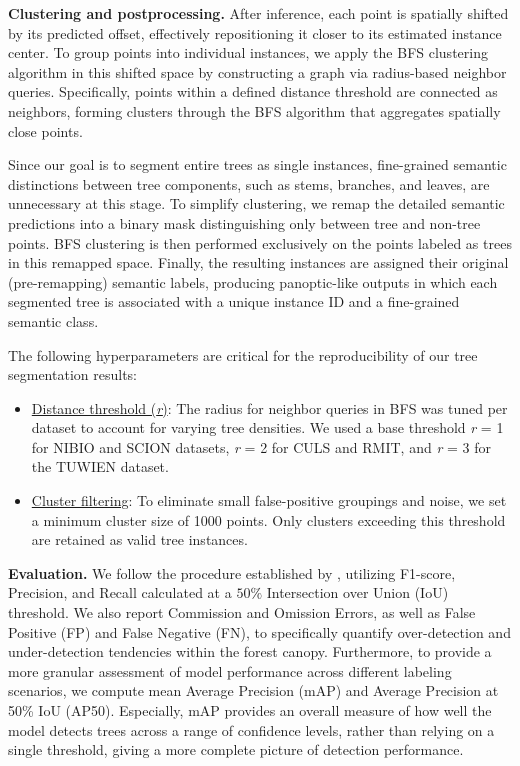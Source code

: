 \documentclass[review,authoryear]{elsarticle}
\begin{document}
\textbf{Clustering and postprocessing.} After inference, each point is spatially shifted by its predicted offset, effectively repositioning it closer to its estimated instance center. To group points into individual instances, we apply the BFS clustering algorithm in this shifted space by constructing a graph via radius-based neighbor queries. Specifically, points within a defined distance threshold are connected as neighbors, forming clusters through the BFS algorithm that aggregates spatially close points. 

Since our goal is to segment entire trees as single instances, fine-grained semantic distinctions between tree components, such as stems, branches, and leaves, are unnecessary at this stage. To simplify clustering, we remap the detailed semantic predictions into a binary mask distinguishing only between tree and non-tree points. BFS clustering is then performed exclusively on the points labeled as trees in this remapped space. Finally, the resulting instances are assigned their original (pre-remapping) semantic labels, producing panoptic-like outputs in which each segmented tree is associated with a unique instance ID and a fine-grained semantic class.

The following hyperparameters are critical for the reproducibility of our tree segmentation results:

\begin{itemize}
    \item \underline{Distance threshold (\textit{r})}: The radius for neighbor queries in BFS was tuned per dataset to account for varying tree densities. We used a base threshold \textit{r} = 1 for NIBIO and SCION datasets, \textit{r} = 2 for CULS and RMIT, and \textit{r} = 3 for the TUWIEN dataset.
    \item \underline{Cluster filtering}: To eliminate small false-positive groupings and noise, we set a minimum cluster size of 1000 points. Only clusters exceeding this threshold are retained as valid tree instances.
\end{itemize}
    

\textbf{Evaluation.} We follow the procedure established by \cite{XIANG2024114078}, utilizing F1-score, Precision, and Recall calculated at a $50\%$ Intersection over Union (IoU) threshold. We also report Commission and Omission Errors, as well as False Positive (FP) and False Negative (FN), to specifically quantify over-detection and under-detection tendencies within the forest canopy. Furthermore, to provide a more granular assessment of model performance across different labeling scenarios, we compute mean Average Precision (mAP) and Average Precision at 50\% IoU (AP50). Especially, mAP provides an overall measure of how well the model detects trees across a range of confidence levels, rather than relying on a single threshold, giving a more complete picture of detection performance.
\end{document}
